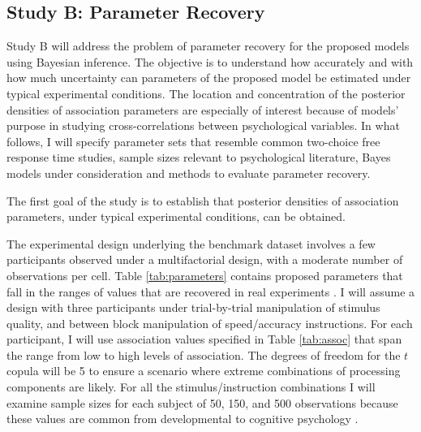 \documentclass[12pt]{article}
\begin{document}

\subsection{Study B: Parameter Recovery}

Study B will address the problem of parameter recovery for the proposed
models using Bayesian inference. The objective is to understand how accurately and with how much uncertainty can parameters of the proposed model be estimated under typical experimental conditions. The location and concentration of the posterior densities of association parameters are especially of interest because of models' purpose in studying cross-correlations between psychological variables. In what follows, I will specify parameter sets that resemble common two-choice free response time studies, sample sizes relevant to psychological literature, Bayes models under consideration and methods to evaluate parameter recovery.

The first goal of the study is to establish that posterior densities of association parameters, under typical  experimental conditions, can be obtained. 

The experimental design underlying the benchmark dataset
involves a few participants observed under a multifactorial
design, with a moderate number of observations per
cell. Table \ref{tab:parameters}   
contains proposed parameters
that fall in the ranges of values that are recovered in real
experiments \citep{MatWag2009}.  I will assume a design with three
participants under trial-by-trial manipulation of stimulus
quality, and between block manipulation of speed/accuracy
instructions. For each participant, I will use association values
specified in Table \ref{tab:assoc} 
that span the range
from low to high levels of association. The degrees of freedom
for the $t$ copula will be 5 to ensure a scenario where extreme combinations of
processing components are likely. For all the stimulus/instruction
combinations I will examine sample sizes for each subject of 50, 150, and 500 observations
because these values are common from developmental to
cognitive psychology \citep{Luc1986,Wag2009,RouLu2005}.
    
\end{document}
